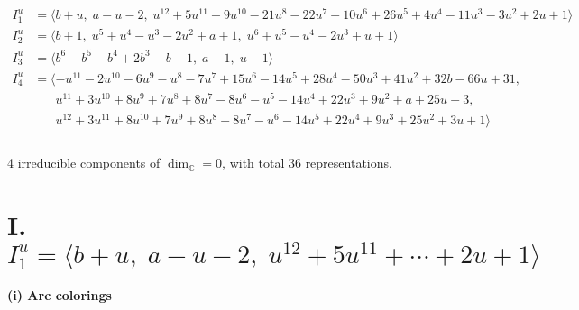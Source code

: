 \documentclass[1p]{elsarticle_modified}
\theoremstyle{definition}
\begin{document}
\begin{align*}
I^u_{1}&=\langle 
b+u,\;a- u-2,\;u^{12}+5 u^{11}+9 u^{10}-21 u^8-22 u^7+10 u^6+26 u^5+4 u^4-11 u^3-3 u^2+2 u+1\rangle \\
I^u_{2}&=\langle 
b+1,\;u^5+u^4- u^3-2 u^2+a+1,\;u^6+u^5- u^4-2 u^3+u+1\rangle \\
I^u_{3}&=\langle 
b^6- b^5- b^4+2 b^3- b+1,\;a-1,\;u-1\rangle \\
I^u_{4}&=\langle 
- u^{11}-2 u^{10}-6 u^9- u^8-7 u^7+15 u^6-14 u^5+28 u^4-50 u^3+41 u^2+32 b-66 u+31,\\
\phantom{I^u_{4}}&\phantom{= \langle  }u^{11}+3 u^{10}+8 u^9+7 u^8+8 u^7-8 u^6- u^5-14 u^4+22 u^3+9 u^2+a+25 u+3,\\
\phantom{I^u_{4}}&\phantom{= \langle  }u^{12}+3 u^{11}+8 u^{10}+7 u^9+8 u^8-8 u^7- u^6-14 u^5+22 u^4+9 u^3+25 u^2+3 u+1\rangle \\
\\
\end{align*}
\raggedright * 4 irreducible components of $\dim_{\mathbb{C}}=0$, with total 36 representations.\\
\newpage
\renewcommand{\arraystretch}{1}
\centering \section*{I. $I^u_{1}= \langle b+u,\;a- u-2,\;u^{12}+5 u^{11}+\cdots+2 u+1 \rangle$}
\flushleft \textbf{(i) Arc colorings}\\
\end{document}
